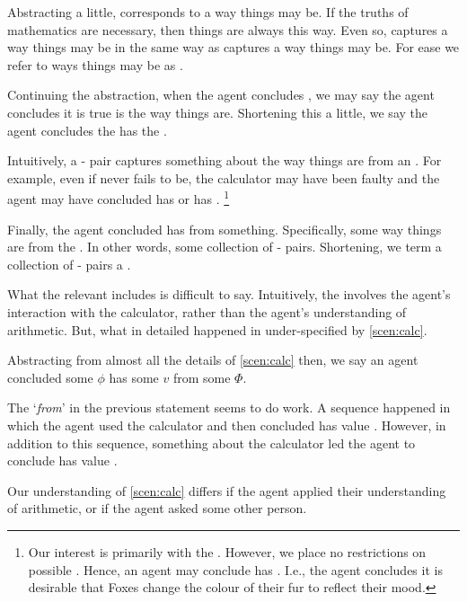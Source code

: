\begin{note}
  Abstracting a little, \propM{\gistCalcEq{}} corresponds to a way things may be.
  If the truths of mathematics are necessary, then things are always this way.
  Even so, \propM{\gistCalcEq{}} captures a way things may be in the same way as  captures a way things may be.
  For ease we refer to ways things may be as \emph{}.

  Continuing the abstraction, when the agent concludes \propM{\gistCalcEq{}}, we may say the agent concludes it is true \propM{\gistCalcEq{}} is the way things are.
  Shortening this a little, we say the agent concludes the \prop{} \propM{\gistCalcEq{}} has the \emph{\val{}} .

  Intuitively, a \prop{}-\val{} pair captures something about the way things are from an \agpe{}.
  For example, even if \propM{\gistCalcEq{}} never fails to be, the calculator may have been faulty and the agent may have concluded \propM{\gistCalcEq{}} has \val{}  or \propM{\gistCalcEqBad{}} has \val{} .%
  \footnote{
    Our interest is primarily with the \val{} .
    However, we place no restrictions on possible .
    Hence, an agent may conclude  has \val{} .
    I.e., the agent concludes it is desirable that Foxes change the colour of their fur to reflect their mood.
  }

  Finally, the agent concluded \propM{\gistCalcEq{}} has \val{}  from something.
  Specifically, some way things are from the \agpe{}.
  In other words, some collection of \prop{}-\val{} pairs.
  Shortening, we term a collection of \prop{}-\val{} pairs a \emph{\pool{}}.

  What the relevant \pool{} includes is difficult to say.
  Intuitively, the \pool{} involves the agent's interaction with the calculator, rather than the agent's understanding of arithmetic.
  But, what in detailed happened in under-specified by \autoref{scen:calc}.
\end{note}


\begin{note}
  Abstracting from almost all the details of \autoref{scen:calc} then, we say an agent concluded some \prop{} \(\phi\) has some \val{} \(v\) from some \pool{} \(\Phi\).

  The `\emph{from}' in the previous statement seems to do work.
  A sequence happened in which the agent used the calculator and then concluded \propM{\gistCalcEq{}} has value .
  However, in addition to this sequence, something about the calculator led the agent to conclude \propM{\gistCalcEq{}} has value .

  Our understanding of \autoref{scen:calc} differs if the agent applied their understanding of arithmetic, or if the agent asked some other person.
\end{note}

